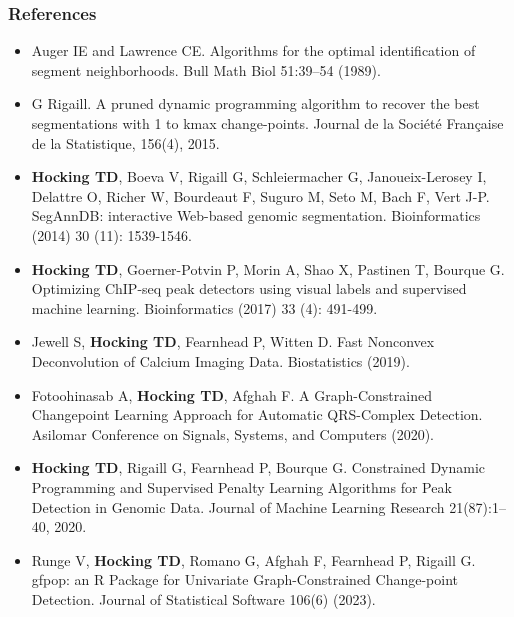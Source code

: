 \documentclass{beamer}
\begin{document}
\begin{frame}
  \frametitle{References}
  \scriptsize
  \begin{itemize}
  \item Auger IE and Lawrence CE. Algorithms for the optimal
    identification of segment neighborhoods. Bull Math Biol 51:39–54
    (1989).
  \item G Rigaill.  A pruned dynamic programming algorithm to recover
    the best segmentations with 1 to kmax change-points. Journal de la
    Société Française de la Statistique, 156(4), 2015. 
  \item \textbf{Hocking TD}, Boeva V, Rigaill G, Schleiermacher G,
    Janoueix-Lerosey I, Delattre O, Richer W, Bourdeaut F, Suguro M,
    Seto M, Bach F, Vert J-P. SegAnnDB: interactive Web-based genomic
    segmentation. Bioinformatics (2014) 30 (11): 1539-1546.
  \item \textbf{Hocking TD}, Goerner-Potvin P, Morin A, Shao X,
    Pastinen T, Bourque G. Optimizing ChIP-seq peak detectors using
    visual labels and supervised machine learning. Bioinformatics
    (2017) 33 (4): 491-499.
  \item Jewell S, \textbf{Hocking TD}, Fearnhead P, Witten D. Fast Nonconvex
    Deconvolution of Calcium Imaging Data. Biostatistics (2019).
  \item Fotoohinasab A, \textbf{Hocking TD}, Afghah F. A
    Graph-Constrained Changepoint Learning Approach for Automatic
    QRS-Complex Detection. Asilomar Conference on Signals, Systems,
    and Computers (2020).
  \item \textbf{Hocking TD}, Rigaill G, Fearnhead P, Bourque G. Constrained
    Dynamic Programming and Supervised Penalty Learning Algorithms for
    Peak Detection in Genomic Data. Journal of Machine Learning
    Research 21(87):1--40, 2020.
  \item Runge V, \textbf{Hocking TD}, Romano G, Afghah F, Fearnhead P, Rigaill
    G. gfpop: an R Package for Univariate Graph-Constrained
    Change-point Detection. Journal of Statistical
    Software 106(6) (2023).
  \end{itemize}
\end{frame}
\end{document}
